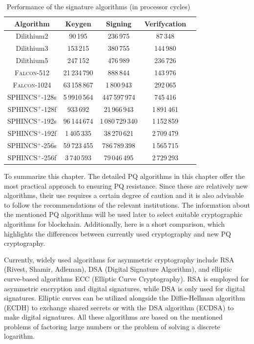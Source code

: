 \begin{table}[h]
    \centering
    \begin{tabular}[p]{| c | c | c | c | c |}
        \hline
        \textbf{Algorithm} & \textbf{Keygen} & \textbf{Signing} & \textbf{Verifycation}\\ \hline
        Dilithium2 & 90\,195 & 236\,975 & 87\,348 \\
        Dilithium3 & 153\,215 & 380\,755 & 144\,980 \\
        Dilithium5 & 247\,152 & 476\,989 & 236\,726 \\
        \hline
        \textsc{Falcon}-512 & 21\,234\,790 & 888\,844 & 143\,976 \\
        \textsc{Falcon}-1024 & 63\,158\,867 & 1\,800\,943 & 292\,065 \\
        \hline
        SPHINCS$^+$-128s & 5\,9910\,564 & 447\,597\,974 & 745\,416 \\
        SPHINCS$^+$-128f & 933\,692 & 21\,966\,943 & 1\,891\,461 \\
        SPHINCS$^+$-192s & 96\,144\,674 & 1\,080\,729\,340 & 1\,152\,859 \\
        SPHINCS$^+$-192f & 1\,405\,335 & 38\,270\,621 & 2\,709\,479 \\
        SPHINCS$^+$-256s & 59\,723\,455 & 786\,789\,398 & 1\,565\,715 \\
        SPHINCS$^+$-256f & 3\,740\,593 & 79\,046\,495 & 2\,729\,293 \\
        \hline
    \end{tabular}
    \caption{Performance of the signature algorithms (in processor cycles)~\cite{kem.signature.performance}}
    \label{tab:signature.performance}
\end{table}

To summarize this chapter. The detailed PQ algorithms in this chapter offer the most practical approach to ensuring PQ resistance. Since these are relatively new algorithms, their use requires a certain degree of caution and it is also advisable to follow the recommendations of the relevant institutions. The information about the mentioned PQ algorithms will be used later to select suitable cryptographic algorithms for blockchain. Additionally, here is a short comparison, which highlights the differences between currently used cryptography and new PQ cryptography.

Currently, widely used algorithms for asymmetric cryptography include RSA (Rivest, Shamir, Adleman), DSA (Digital Signature Algorithm), and elliptic curve-based algorithms ECC (Elliptic Curve Cryptography). RSA is employed for asymmetric encryption and digital signatures, while DSA is only used for digital signatures. Elliptic curves can be utilized alongside the Diffie-Hellman algorithm (ECDH) to exchange shared secrets or with the DSA algorithm (ECDSA) to make digital signatures. All these algorithms are based on the mentioned problems of factoring large numbers or the problem of solving a discrete logarithm.

